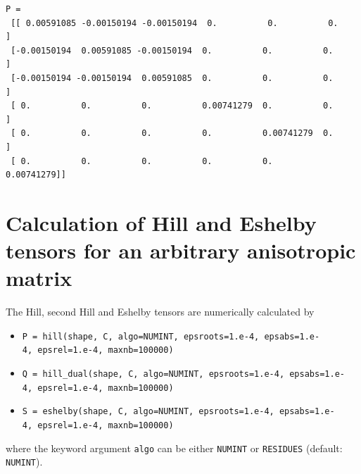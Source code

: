 \documentclass[
  letterpaper,
  DIV=11,
  numbers=noendperiod]{scrreprt}
\providecommand{\tightlist}{%
  \setlength{\itemsep}{0pt}\setlength{\parskip}{0pt}}\usepackage{longtable,booktabs,array}
\begin{document}
\begin{tcolorbox}
\begin{verbatim}
P =
 [[ 0.00591085 -0.00150194 -0.00150194  0.          0.          0.        ]
 [-0.00150194  0.00591085 -0.00150194  0.          0.          0.        ]
 [-0.00150194 -0.00150194  0.00591085  0.          0.          0.        ]
 [ 0.          0.          0.          0.00741279  0.          0.        ]
 [ 0.          0.          0.          0.          0.00741279  0.        ]
 [ 0.          0.          0.          0.          0.          0.00741279]]
\end{verbatim}

\end{tcolorbox}

\section{Calculation of Hill and Eshelby tensors for an arbitrary
anisotropic
matrix}\label{calculation-of-hill-and-eshelby-tensors-for-an-arbitrary-anisotropic-matrix}

The Hill, second Hill and Eshelby tensors are numerically calculated by

\begin{itemize}
\tightlist
\item
  \texttt{P\ =\ hill(shape,\ C,\ algo=NUMINT,\ epsroots=1.e-4,\ epsabs=1.e-4,\ epsrel=1.e-4,\ maxnb=100000)}
\item
  \texttt{Q\ =\ hill\_dual(shape,\ C,\ algo=NUMINT,\ epsroots=1.e-4,\ epsabs=1.e-4,\ epsrel=1.e-4,\ maxnb=100000)}
\item
  \texttt{S\ =\ eshelby(shape,\ C,\ algo=NUMINT,\ epsroots=1.e-4,\ epsabs=1.e-4,\ epsrel=1.e-4,\ maxnb=100000)}
\end{itemize}

where the keyword argument \texttt{algo} can be either \texttt{NUMINT}
or \texttt{RESIDUES} (default: \texttt{NUMINT}).
\end{document}
